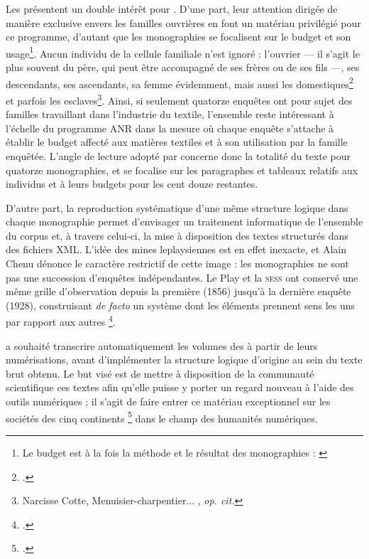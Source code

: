 Les \odm{} présentent un double intérêt pour \timeus. D'une part, leur attention dirigée de manière exclusive envers les familles ouvrières en font un matériau privilégié pour ce programme, d'autant que les monographies se focalisent sur le budget et son usage\footnote{Le budget est \og à la fois la méthode et le résultat \fg{} des monographies : \cite[p. 11]{cardoni}}. Aucun individu de la cellule familiale n'est ignoré : l'ouvrier --- il s'agit le plus souvent du père, qui peut être accompagné de ses frères ou de ses fils ---, ses descendants, ses ascendants, sa femme évidemment, mais aussi les domestiques\footcite{mono018a} et parfois les esclaves\footnote{Narcisse Cotte, \og Menuisier-charpentier... \fg{}, \textit{op. cit.}}. Ainsi, si seulement quatorze enquêtes ont pour sujet des familles travaillant dans l'industrie du textile, l'ensemble reste intéressant à l'échelle du programme ANR dans la mesure où chaque enquête s'attache à établir le budget affecté aux matières textiles et à son utilisation par la famille enquêtée. L'angle de lecture adopté par \timeus{} concerne donc la totalité du texte pour quatorze monographies, et se focalise sur les paragraphes et tableaux relatifs aux individus et à leurs budgets pour les cent douze restantes.

D'autre part, la reproduction systématique d'une même structure logique dans chaque monographie permet d'envisager un traitement informatique de l'ensemble du corpus et, à travers celui-ci, la mise à disposition des textes structurés dans des fichiers XML. L'idée des \og mines \fg{} leplaysiennes est en effet inexacte, et Alain Chenu dénonce le caractère restrictif de cette image : les monographies ne sont pas une succession d'enquêtes indépendantes. Le Play et la \textsc{sess} ont conservé une même \og grille d'observation \fg{} depuis la première (1856) jusqu'à la dernière enquête (1928), construisant \textit{de facto} un \og système dont les éléments prennent sens les uns par rapport aux autres \fg{}\footcite[p. 5]{chenu}.

\timeus{} a souhaité transcrire automatiquement les volumes des \odm{} à partir de leurs numérisations, avant d'implémenter la structure logique d'origine au sein du texte brut obtenu. Le but visé est de mettre à disposition de la communauté scientifique ces textes afin qu'elle puisse y porter un regard nouveau à l'aide des outils numériques ; il s'agit de faire entrer ce \og matériau exceptionnel sur les sociétés des cinq continents \fg{}\footcite{savoye} dans le champ des humanités numériques.

